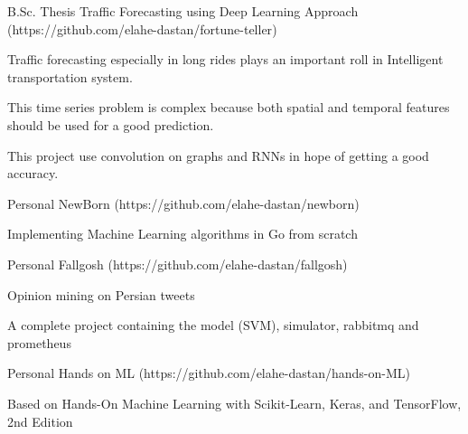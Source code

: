 

\begin{cventries}

    \cventry
    {B.Sc. Thesis} %
    {Traffic Forecasting using Deep Learning Approach ({\tiny https://github.com/elahe-dastan/fortune-teller})} %
    {} %
    {} %
    {
      \begin{cvitems} %
        \item{Traffic forecasting especially in long rides plays an important roll in Intelligent transportation system.}
        \item{This time series problem is complex because both spatial and temporal features should be used for a good prediction.}
        \item{This project use convolution on graphs and RNNs in hope of getting a good accuracy.}
      \end{cvitems}
    }

    \cventry
    {Personal} %
    {NewBorn ({\tiny https://github.com/elahe-dastan/newborn})} %
    {} %
    {} %
    {
      \begin{cvitems} %
        \item{Implementing Machine Learning algorithms in Go from scratch}
      \end{cvitems}
    }

    \cventry
    {Personal} %
    {Fallgosh ({\tiny https://github.com/elahe-dastan/fallgosh})} %
    {} %
    {} %
    {
      \begin{cvitems} %
        \item{Opinion mining on Persian tweets}
        \item{A complete project containing the model (SVM), simulator, rabbitmq and prometheus}
      \end{cvitems}
    }

    \cventry
    {Personal} %
    {Hands on ML ({\tiny https://github.com/elahe-dastan/hands-on-ML})} %
    {} %
    {} %
    {
      \begin{cvitems} %
        \item{Based on Hands-On Machine Learning with Scikit-Learn, Keras, and TensorFlow, 2nd Edition }
      \end{cvitems}
    }


\end{cventries}
